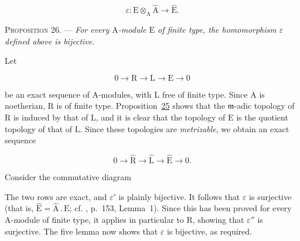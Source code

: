 \begin{equation*}
\varepsilon:\mathrm{E}\otimes_\mathrm{A}\widehat{\mathrm{A}}\longrightarrow\widehat{\mathrm{E}}.
\end{equation*}

\textsc{Proposition 26}. --- \emph{For every
$\mathrm{A}$-module $\mathrm{E}$ of finite type, the homomorphism $\varepsilon$ defined above is
bijective.}

Let

\begin{equation*}
0\longrightarrow \mathrm{R}\longrightarrow \mathrm{L}\longrightarrow \mathrm{E}\longrightarrow0
\end{equation*}

be an exact sequence of $\mathrm{A}$-modules, with $\mathrm{L}$ free of finite type. Since $\mathrm{A}$
is noetherian, $\mathrm{R}$ is of finite type. Proposition~\hyperref[gaga:prop:25]{25}
shows that the $\mathfrak{m}$-adic topology of $\mathrm{R}$ is induced by that of $\mathrm{L}$,
and it is clear that the topology of $\mathrm{E}$ is the quotient topology of that of
$\mathrm{L}$. Since these topologies are \emph{metrizable}, we obtain an exact sequence

\begin{equation*}
0\longrightarrow\widehat{\mathrm{R}}\longrightarrow\widehat{\mathrm{L}}
\longrightarrow\widehat{\mathrm{E}}\longrightarrow0.
\end{equation*}

Consider the commutative diagram

\begin{center}
\end{center}

The two rows are exact, and $\varepsilon'$ is plainly bijective. It follows
that $\varepsilon$ is surjective (that is,
$\widehat{\mathrm{E}}=\widehat{\mathrm{A}}\mathbin{.}\mathrm{E}$; cf. , p.~153, Lemma~1). Since this
has been proved for every $\mathrm{A}$-module of finite type, it applies in particular
to $\mathrm{R}$, showing that $\varepsilon''$ is surjective. The five lemma now shows
that $\varepsilon$ is bijective, as required.

